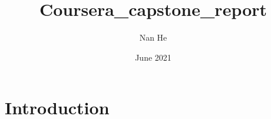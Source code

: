 \documentclass{article}
\title{Coursera_capstone_report}
\author{Nan He}
\date{June 2021}
\begin{document}
\maketitle

\section{Introduction}
\end{document}

